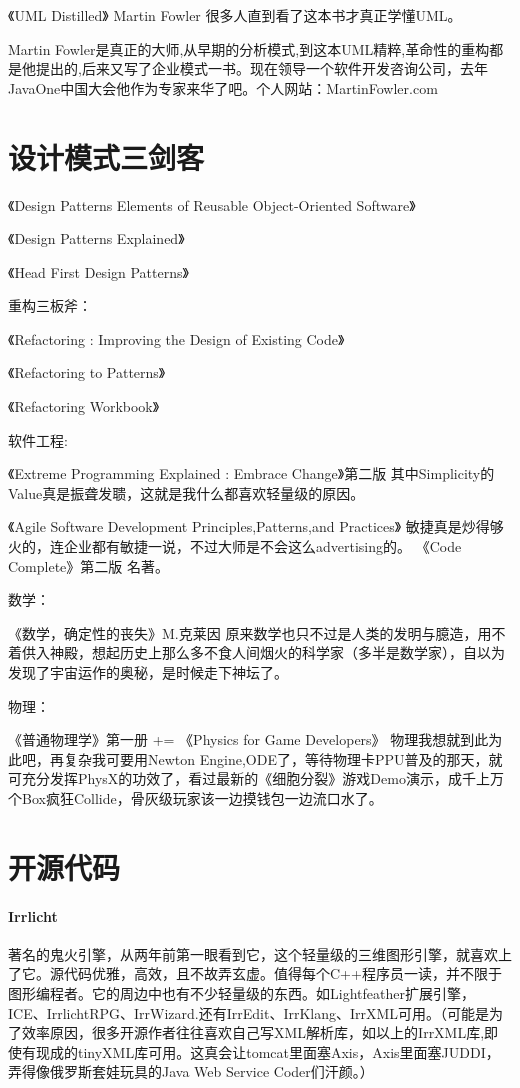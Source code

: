 \documentclass[UTF8,a4paper,8pt]{ctexart}
\begin{document}
《UML Distilled》 Martin Fowler
很多人直到看了这本书才真正学懂UML。

Martin Fowler是真正的大师,从早期的分析模式,到这本UML精粹,革命性的重构都是他提出的,后来又写了企业模式一书。现在领导一个软件开发咨询公司，去年JavaOne中国大会他作为专家来华了吧。个人网站：MartinFowler.com
\section{设计模式三剑客}
《Design Patterns Elements of Reusable Object-Oriented Software》

《Design Patterns Explained》

《Head First Design Patterns》

重构三板斧：

《Refactoring : Improving the Design of Existing Code》

《Refactoring to Patterns》

《Refactoring Workbook》

软件工程:

《Extreme Programming Explained : Embrace Change》第二版
其中Simplicity的Value真是振聋发聩，这就是我什么都喜欢轻量级的原因。

《Agile Software Development Principles,Patterns,and Practices》
敏捷真是炒得够火的，连企业都有敏捷一说，不过大师是不会这么advertising的。
《Code Complete》第二版
名著。

数学：

《数学，确定性的丧失》M.克莱因
原来数学也只不过是人类的发明与臆造，用不着供入神殿，想起历史上那么多不食人间烟火的科学家（多半是数学家），自以为发现了宇宙运作的奥秘，是时候走下神坛了。

物理：

《普通物理学》第一册 += 《Physics for Game Developers》
物理我想就到此为此吧，再复杂我可要用Newton Engine,ODE了，等待物理卡PPU普及的那天，就可充分发挥PhysX的功效了，看过最新的《细胞分裂》游戏Demo演示，成千上万个Box疯狂Collide，骨灰级玩家该一边摸钱包一边流口水了。
\section{开源代码}
\paragraph{Irrlicht}
著名的鬼火引擎，从两年前第一眼看到它，这个轻量级的三维图形引擎，就喜欢上了它。源代码优雅，高效，且不故弄玄虚。值得每个C++程序员一读，并不限于图形编程者。它的周边中也有不少轻量级的东西。如Lightfeather扩展引擎，ICE、IrrlichtRPG、IrrWizard.还有IrrEdit、IrrKlang、IrrXML可用。（可能是为了效率原因，很多开源作者往往喜欢自己写XML解析库，如以上的IrrXML库,即使有现成的tinyXML库可用。这真会让tomcat里面塞Axis，Axis里面塞JUDDI，弄得像俄罗斯套娃玩具的Java Web Service Coder们汗颜。）
\end{document}
